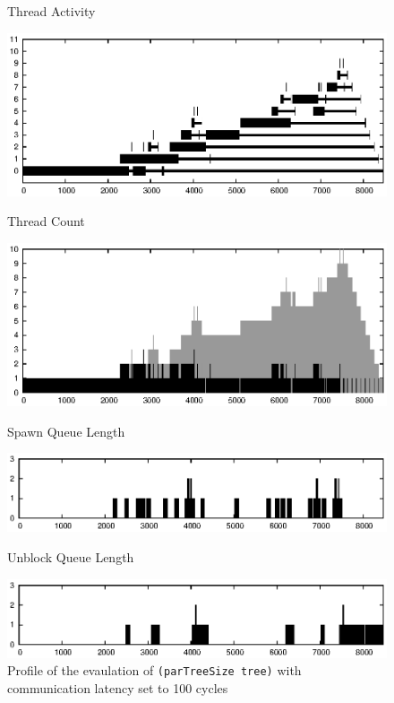 \documentclass{llncs}
\begin{document}
\begin{figure}

Thread Activity

\includegraphics[width=12cm]{image/treeSize23_delay100-activity.eps}

Thread Count

\includegraphics[width=12cm]{image/treeSize23_delay100-threads.eps}

Spawn Queue Length

\includegraphics[width=12cm]{image/treeSize23_delay100-spawnQueueLength.eps}

Unblock Queue Length

\includegraphics[width=12cm]{image/treeSize23_delay100-unblockQueueLength.eps}

\caption{Profile of the evaulation of \texttt{(parTreeSize tree)} with communication latency set to 100 cycles}
\label{figTreeProfile}
\end{figure}
\end{document}
